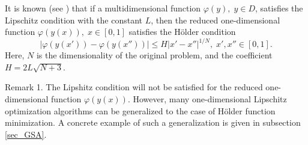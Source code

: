 \documentclass[preprint,12pt]{elsarticle}
\begin{document}
It is known (see \cite{Strongin2000}) that if a multidimensional function  $\varphi(y), \; y \in D$,  satisfies the Lipschitz condition with the constant $L$, then the reduced one-dimensional function $\varphi(y(x)), \; x \in [0,1]$ satisfies the H{\"o}lder condition
\[
\left|\varphi(y(x'))-\varphi(y(x''))\right|\leq H\left|x'-x''\right|^{1/N}, \; x',x''\in[0,1].
\]
Here, $N$ is the dimensionality of the original problem, and the coefficient
$ H=2 L \sqrt{N+3}$.

Remark 1.  The Lipshitz condition will not be satisfied for the reduced one-dimensional function $\varphi(y(x))$. However, many one-dimensional Lipschitz optimization algorithms can be generalized to the case of H{\"o}lder function minimization. A concrete example of such a generalization is given in subsection \ref{sec_GSA}.
\end{document}
